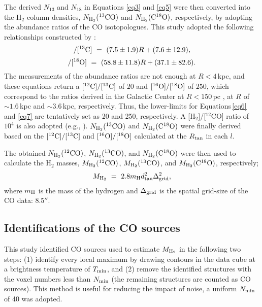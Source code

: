 \documentclass[proof]{pasj01}
\newcommand{\mtwo}{M_{\rm H_2}{\rm (^{12}CO)}}
\newcommand{\mthree}{M_{\rm H_2}{\rm (^{13}CO)}}
\newcommand{\meight}{M_{\rm H_2}{\rm (C^{18}O)}}
\begin{document}
The derived $N_{13}$ and $N_{18}$ in Equations \ref{eq3} and \ref{eq5} were then converted into the H$_2$ column densities, $N_{\rm H_2}({\rm ^{13}CO})$ and $N_{\rm H_2}({\rm C^{18}O})$, respectively, by adopting the abundance ratios of the CO isotopologues.
This study adopted the following relationships constructed by \citet{wil1994}:
\begin{equation}
[{\rm ^{12}C}]/[{\rm ^{13}C}] \ = \ (7.5\pm1.9) R + (7.6\pm12.9), \label{eq6}
\end{equation}
\begin{equation}
[{\rm ^{16}O}]/[{\rm ^{18}O}] \ = \ (58.8\pm11.8) R + (37.1\pm82.6). \label{eq7}
\end{equation}
The measurements of the abundance ratios are not enough at $R < 4$\,kpc, and these equations return a $[{\rm ^{12}C}]/[{\rm ^{13}C}]$ of $20$ and $[{\rm ^{16}O}]/[{\rm ^{18}O}]$ of $250$, which correspond to the ratios derived in the Galactic Center at $R<150$\,pc \citep{wil1994}, at $R$ of $\sim1.6$\,kpc and $\sim3.6$\,kpc, respectively.
Thus, the lower-limits for Equations\,\ref{eq6} and \ref{eq7} are tentatively set as 20 and 250, respectively.
A [H$_2$]/[$^{12}$CO] ratio of $10^4$ is also adopted (e.g., \cite{fre1982, leu1984}).
$N_{\rm H_2}({\rm ^{13}CO})$ and $N_{\rm H_2}({\rm C^{18}O})$ were finally derived based on the $[{\rm ^{12}C}]/[{\rm ^{13}C}]$ and $[{\rm ^{16}O}]/[{\rm ^{18}O}]$ calculated at the $R_{\rm tan}$ in each $l$.

The obtained $N_{\rm H_2}({\rm ^{12}CO})$, $N_{\rm H_2}({\rm ^{13}CO})$, and $N_{\rm H_2}({\rm C^{18}O})$ were then used to calculate the H$_2$ masses, $\mtwo$, $\mthree$, and $\meight$, respectively;
\begin{equation}
M_{\rm H_2} \ = \ 2.8 m_{\rm H} d_{\rm tan}^2 \Delta_{\rm grid}^2, \label{eq7}
\end{equation}
where $m_{\rm H}$ is the mass of the hydrogen and $\Delta_{\rm grid}$ is the spatial grid-size of the CO data: 8.5$''$.

\subsection{Identifications of the CO sources}
This study identified CO sources used to estimate $M_{\rm H_2}$ in the following two steps: (1) identify every local maximum by drawing contours in the data cube at a brightness temperature of $T_{\rm min}$, and (2) remove the identified structures with the voxel numbers less than $N_{\rm min}$ (the remaining structures are counted as CO sources).
This method is useful for reducing the impact of noise, a uniform $N_{\rm min}$ of 40 was adopted.
\end{document}

